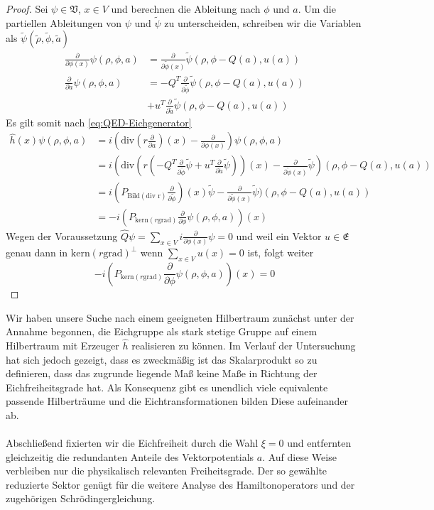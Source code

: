 \documentclass[11pt,a4paper,leqno]{report}
\numberwithin{equation}{chapter}
\begin{document}
\begin{proof}
	Sei $\psi\in \mathfrak{V}$, $x\in V$ und berechnen die Ableitung nach $\phi$ und $a$. Um die partiellen Ableitungen von $\psi$ und $\tilde{\psi}$ zu unterscheiden, schreiben wir die Variablen als $\tilde{\psi}(\tilde{\rho},\tilde{\phi},\tilde{a})$
	\begin{align*}
		\frac{\partial}{\partial \phi(x)}\psi(\rho,\phi,a)&=\frac{\partial}{\partial \tilde{\phi}(x)}\tilde{\psi}(\rho, \phi-Q(a), u(a))\\
	\frac{\partial}{\partial a}\psi(\rho,\phi,a)&=-Q^T\frac{\partial}{\partial \tilde{\phi}}\tilde{\psi}(\rho, \phi-Q(a),  u(a))\\
	&+u^T\frac{\partial}{\partial \tilde{a}}\tilde{\psi}(\rho, \phi-Q(a), u(a))
	\end{align*}
Es gilt somit nach \eqref{eq:QED-Eichgenerator}
\begin{align*}
	\hat{h}(x)\psi(\rho,\phi,a) &= i(\text{div}(r\frac{\partial}{\partial a})(x)-\frac{\partial}{\partial\phi(x)})\psi(\rho,\phi,a)
	\\&=i(\text{div}(r(-Q^T\frac{\partial}{\partial \tilde{\phi}}\tilde{\psi}+u^T\frac{\partial}{\partial \tilde{a}}\tilde{\psi}))(x)-\frac{\partial}{\partial\tilde{\phi}(x)}\tilde{\psi})(\rho, \phi-Q(a), u(a))\\
	&=i(P_{\text{Bild}(\text{div r})}\frac{\partial}{\partial \tilde{\phi}})(x)\tilde{\psi}-\frac{\partial}{\partial\tilde{\phi}(x)}\tilde{\psi})(\rho, \phi-Q(a), u(a))\\
	&=-i(P_{\text{kern}(r\text{grad})}\frac{\partial}{\partial\phi}\psi(\rho,\phi,a))(x)
\end{align*}
Wegen der Voraussetzung $\hat{Q}\psi=\sum_{x\in V}i\frac{\partial}{\partial \phi(x)}\psi = 0$ und weil
ein Vektor $u\in\mathfrak{E}$ genau dann in $\text{kern}(r\text{grad})^\perp$ wenn $\sum_{x\in V}u(x)=0$ ist, folgt weiter
\begin{equation*}
-i(P_{\text{kern}(r\text{grad})}\frac{\partial}{\partial\phi}\psi(\rho,\phi,a))(x)=0
\end{equation*}
\end{proof}
\noindent
Wir haben unsere Suche nach einem geeigneten Hilbertraum zunächst unter der Annahme begonnen, die Eichgruppe als stark stetige Gruppe auf einem Hilbertraum mit Erzeuger $\hat h$ realisieren zu können. 
Im Verlauf der Untersuchung hat sich jedoch gezeigt, dass es zweckmäßig ist das Skalarprodukt so zu definieren, dass das zugrunde liegende Maß keine Maße in Richtung der Eichfreiheitsgrade hat. Als Konsequenz gibt es unendlich viele equivalente passende Hilberträume und die Eichtransformationen bilden Diese aufeinander ab.
\\
\\
Abschließend fixierten wir die Eichfreiheit durch die Wahl $\xi = 0$ und entfernten gleichzeitig die redundanten Anteile des Vektorpotentials $a$. Auf diese Weise verbleiben nur die physikalisch relevanten Freiheitsgrade. Der so gewählte reduzierte Sektor genügt für die weitere Analyse des Hamiltonoperators und der zugehörigen Schrödingergleichung.
\end{document}
